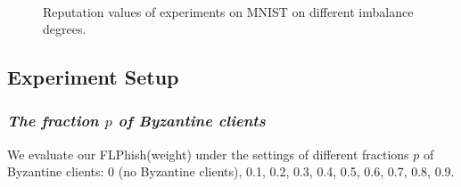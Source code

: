 \documentclass[journal]{IEEEtran}
\begin{document}
\begin{figure}[!htp]
  \\
  \caption{Reputation values of experiments on MNIST on different imbalance degrees.}
  \label{fig_exp_reputation}
  \vspace{0.2in}
\end{figure}


\subsection{Experiment Setup}


  \subsubsection{{\textit{The fraction {$p$} of Byzantine clients}}} We evaluate our FLPhish(weight) under the settings of different fractions $p$ of Byzantine clients: 0 (no Byzantine clients), 0.1, 0.2, 0.3, 0.4, 0.5, 0.6, 0.7, 0.8, 0.9.
\end{document}
